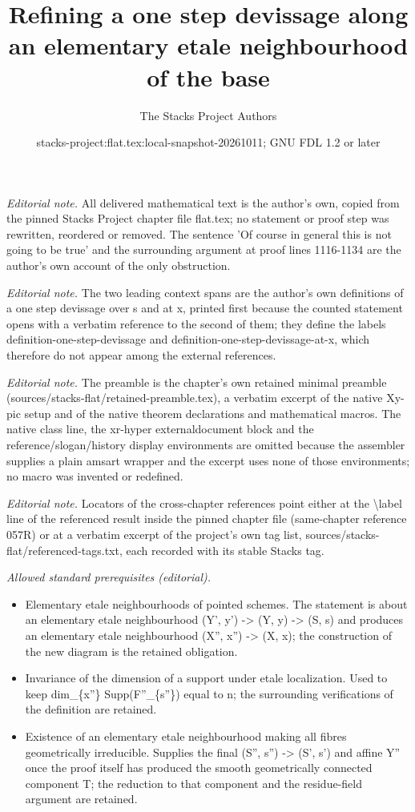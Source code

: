 \documentclass[10pt,a4paper]{amsart}
\title{Refining a one step devissage along an elementary etale neighbourhood of the base}
\author{The Stacks Project Authors}
\date{stacks-project:flat.tex:local-snapshot-20261011; GNU FDL 1.2 or later}
\theoremstyle{plain}
\theoremstyle{definition}
\theoremstyle{remark}
\numberwithin{equation}{subsection}
\begin{document}
\maketitle
\noindent\textit{Editorial note.} All delivered mathematical text is the author's own, copied from the pinned Stacks Project chapter file flat.tex; no statement or proof step was rewritten, reordered or removed. The sentence 'Of course in general this is not going to be true' and the surrounding argument at proof lines 1116-1134 are the author's own account of the only obstruction.\par\medskip
\noindent\textit{Editorial note.} The two leading context spans are the author's own definitions of a one step devissage over s and at x, printed first because the counted statement opens with a verbatim reference to the second of them; they define the labels definition-one-step-devissage and definition-one-step-devissage-at-x, which therefore do not appear among the external references.\par\medskip
\noindent\textit{Editorial note.} The preamble is the chapter's own retained minimal preamble (sources/stacks-flat/retained-preamble.tex), a verbatim excerpt of the native Xy-pic setup and of the native theorem declarations and mathematical macros. The native class line, the xr-hyper externaldocument block and the reference/slogan/history display environments are omitted because the assembler supplies a plain amsart wrapper and the excerpt uses none of those environments; no macro was invented or redefined.\par\medskip
\noindent\textit{Editorial note.} Locators of the cross-chapter references point either at the \textbackslash{}label line of the referenced result inside the pinned chapter file (same-chapter reference 057R) or at a verbatim excerpt of the project's own tag list, sources/stacks-flat/referenced-tags.txt, each recorded with its stable Stacks tag.\par\medskip
\noindent\textit{Allowed standard prerequisites (editorial).}\begin{itemize}
\item Elementary etale neighbourhoods of pointed schemes. The statement is about an elementary etale neighbourhood (Y', y') -> (Y, y) -> (S, s) and produces an elementary etale neighbourhood (X'', x'') -> (X, x); the construction of the new diagram is the retained obligation.
\item Invariance of the dimension of a support under etale localization. Used to keep dim\_\{x''\} Supp(F''\_\{s''\}) equal to n; the surrounding verifications of the definition are retained.
\item Existence of an elementary etale neighbourhood making all fibres geometrically irreducible. Supplies the final (S'', s'') -> (S', s') and affine Y'' once the proof itself has produced the smooth geometrically connected component T; the reduction to that component and the residue-field argument are retained.
\end{itemize}\medskip
\end{document}

